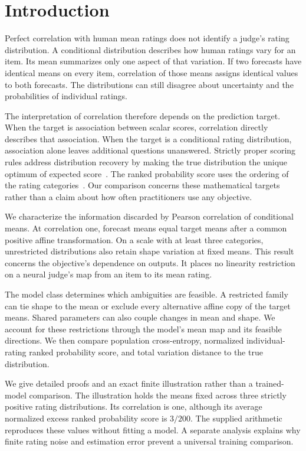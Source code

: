 \documentclass[11pt,letterpaper]{article}
\begin{document}
\section{Introduction}
Perfect correlation with human mean ratings does not identify a judge's rating distribution.
A conditional distribution describes how human ratings vary for an item.
Its mean summarizes only one aspect of that variation.
If two forecasts have identical means on every item, correlation of those means assigns identical values to both forecasts.
The distributions can still disagree about uncertainty and the probabilities of individual ratings.

The interpretation of correlation therefore depends on the prediction target.
When the target is association between scalar scores, correlation directly describes that association.
When the target is a conditional rating distribution, association alone leaves additional questions unanswered.
Strictly proper scoring rules address distribution recovery by making the true distribution the unique optimum of expected score~\cite{gneiting2007}.
The ranked probability score uses the ordering of the rating categories~\cite{epstein1969}.
Our comparison concerns these mathematical targets rather than a claim about how often practitioners use any objective.

We characterize the information discarded by Pearson correlation of conditional means.
At correlation one, forecast means equal target means after a common positive affine transformation.
On a scale with at least three categories, unrestricted distributions also retain shape variation at fixed means.
This result concerns the objective's dependence on outputs.
It places no linearity restriction on a neural judge's map from an item to its mean rating.

The model class determines which ambiguities are feasible.
A restricted family can tie shape to the mean or exclude every alternative affine copy of the target means.
Shared parameters can also couple changes in mean and shape.
We account for these restrictions through the model's mean map and its feasible directions.
We then compare population cross-entropy, normalized individual-rating ranked probability score, and total variation distance to the true distribution.

We give detailed proofs and an exact finite illustration rather than a trained-model comparison.
The illustration holds the means fixed across three strictly positive rating distributions.
Its correlation is one, although its average normalized excess ranked probability score is $3/200$.
The supplied arithmetic reproduces these values without fitting a model.
A separate analysis explains why finite rating noise and estimation error prevent a universal training comparison.
\end{document}
